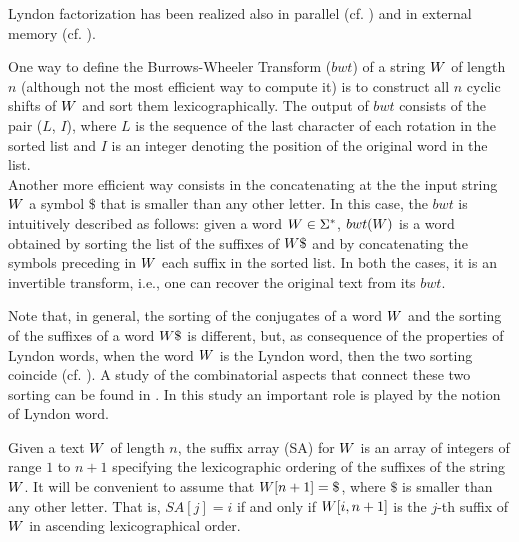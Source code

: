 \documentclass[envcountsame,runningheads]{llncs}
\begin{document}
Lyndon factorization has been realized also in parallel (cf. \cite{ApostolicoCrochemore1995}) and in external memory (cf. \cite{RohCrochemoreIliopoulosPark:2008}).

One way to define the Burrows-Wheeler Transform ($bwt$) \cite{bwt94} of a string $W$ of length $n$ (although not the most efficient way to compute it) is to construct all $n$ cyclic shifts of $W$ and sort them lexicographically. The output of $bwt$ consists of the pair ($L$, $I$), where $L$ is the sequence of the last character of each rotation in the sorted list and $I$ is an integer denoting the position of the original word in the list.\\
Another more efficient way consists in the concatenating at the the input string $W$ a symbol $\$$ that is smaller than any other letter.
In this case, the $bwt$ is intuitively described as follows:
given a word $W\in \Sigma^*$, ${bwt}(W)$ is a word obtained by sorting the list of the suffixes of $\bigT\$$ and by concatenating the symbols preceding in $W$ each suffix in the sorted list.
In both the cases, it is an invertible transform, i.e., one can recover the original text from its $bwt$.

Note that, in general, the sorting of the conjugates of a word $W$ and the sorting of the suffixes of a word $\bigT\$$ is different, but, as consequence of the properties of Lyndon words, when the word $W$ is the Lyndon word, then the two sorting coincide (cf. \cite[Lemma 12]{GRS2007}).
A study of the combinatorial aspects that connect these two sorting can be found in \cite{BonomoMRRSDLT2013}. In this study an important role is played by the notion of Lyndon word.

Given a text $W$ of length $n$, the suffix array  (SA) for $W$ is an array of integers of range $1$ to $n+1$ specifying the lexicographic ordering of the suffixes of the string $W$. It will be convenient to assume that $\bigT[n+1] = \$$, where $\$$ is smaller than any other letter.
That is, $SA[j] = i$ if and only if $W[i, n+1]$ is the $j$-th suffix of $W$ in ascending lexicographical order.
\end{document}
